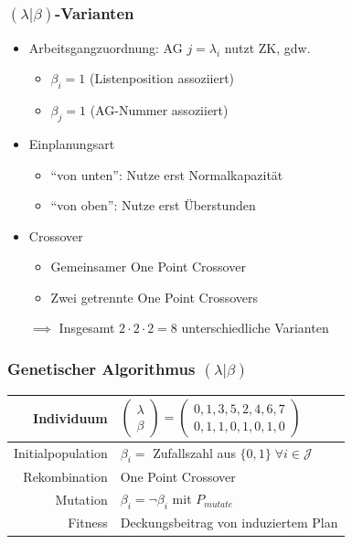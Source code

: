 \begin{frame}
	\frametitle{$(\lambda|\beta)$-Varianten}
	\begin{itemize}
		\item Arbeitsgangzuordnung: AG $j=\lambda_i$ nutzt ZK, gdw.
		\begin{itemize}
			\item $\beta_i=1$ (Listenposition assoziiert)
			\item $\beta_j=1$ (AG-Nummer assoziiert)\\[4mm]
		\end{itemize}
		\item Einplanungsart
		\begin{itemize}
			\item "`von unten"': Nutze erst Normalkapazität
			\item "`von oben"': Nutze erst Überstunden\\[4mm]
		\end{itemize}
		\item Crossover
		\begin{itemize}
			\item Gemeinsamer One Point Crossover
			\item Zwei getrennte One Point Crossovers\\[5mm]
		\end{itemize}
		\item[$\implies$] Insgesamt $2 \cdot 2 \cdot 2 = 8$ unterschiedliche Varianten
	\end{itemize}
\end{frame}

\begin{frame}
	\frametitle{Genetischer Algorithmus $(\lambda|\beta)$}
	\begin{small}
		\begin{center}
			\begin{tabular}{rl}
				\hline 
				Individuum & $\begin{pmatrix}\lambda\\\beta\end{pmatrix}=\begin{pmatrix}0,1,3,5,2,4,6,7\\0,1,1,0,1,0,1,0\end{pmatrix}$\parbox[c][40pt][c]{0pt}{}\tabularnewline
				\hline 
				Initialpopulation & $\beta_i=$ Zufallszahl aus $\{0,1\} \; \forall i \in \mathcal{J}$\tabularnewline
				\hline 
				Rekombination & One Point Crossover\tabularnewline
				\hline 
				Mutation & $\beta_i=\neg \beta_i$ mit $P_{mutate}$\tabularnewline
				\hline 
				Fitness & Deckungsbeitrag von induziertem Plan\tabularnewline
				\hline 
			\end{tabular}
		\end{center}
	\end{small}
\end{frame}

